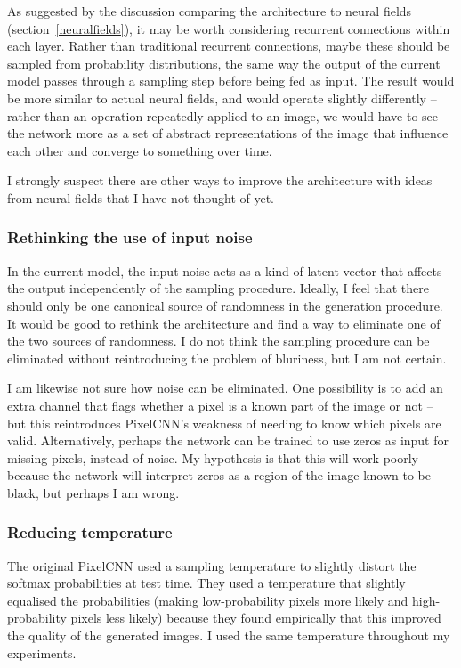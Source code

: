 \documentclass[11pt, a4paper, openany]{book}
\begin{document}
As suggested by the discussion comparing the architecture to neural fields (section~\ref{neuralfields}), it may be worth considering recurrent connections within each layer. Rather than traditional recurrent connections, maybe these should be sampled from probability distributions, the same way the output of the current model passes through a sampling step before being fed as input. The result would be more similar to actual neural fields, and would operate slightly differently -- rather than an operation repeatedly applied to an image, we would have to see the network more as a set of abstract representations of the image that influence each other and converge to something over time.

I strongly suspect there are other ways to improve the architecture with ideas from neural fields that I have not thought of yet.

\subsubsection{Rethinking the use of input noise}

In the current model, the input noise acts as a kind of latent vector that affects the output independently of the sampling procedure. Ideally, I feel that there should only be one canonical source of randomness in the generation procedure. It would be good to rethink the architecture and find a way to eliminate one of the two sources of randomness. I do not think the sampling procedure can be eliminated without reintroducing the problem of bluriness, but I am not certain.

I am likewise not sure how noise can be eliminated. One possibility is to add an extra channel that flags whether a pixel is a known part of the image or not -- but this reintroduces PixelCNN's weakness of needing to know which pixels are valid. Alternatively, perhaps the network can be trained to use zeros as input for missing pixels, instead of noise. My hypothesis is that this will work poorly because the network will interpret zeros as a region of the image known to be black, but perhaps I am wrong.

\subsubsection{Reducing temperature} \label{temperature}

The original PixelCNN used a sampling temperature \citep{pixelcnn2} to slightly distort the softmax probabilities at test time. They used a temperature that slightly equalised the probabilities (making low-probability pixels more likely and high-probability pixels less likely) because they found empirically that this improved the quality of the generated images. I used the same temperature throughout my experiments.
\end{document}

